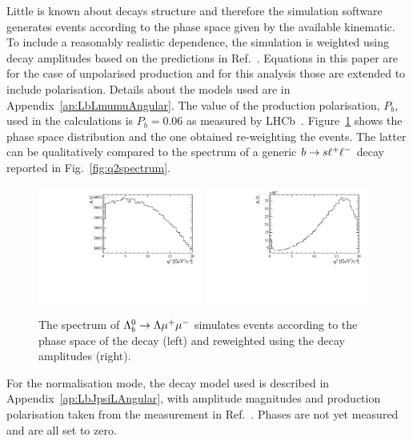 Little is known about \Lb decays structure and therefore the simulation software generates events
according to the phase space given by the available kinematic. To include a reasonably realistic \qsq dependence,
the simulation is weighted using decay amplitudes based on the predictions in Ref.~\cite{Gutsche:2013pp}.
Equations in this paper are for the case of unpolarised \Lb production and for this analysis those are extended to include polarisation.
Details about the models used are in Appendix~\ref{ap:LbLmumuAngular}. The value of the \Lb production polarisation, $P_b$, 
used in the calculations is $P_b = 0.06$ as measured by LHCb~\cite{Aaij:2013oxa}. 
Figure~\ref{fig:decaymodeleffonq2} shows the phase space \qsq distribution and the one obtained re-weighting the events.
The latter can be qualitatively compared to the \qsq spectrum of a generic ${b}\rightarrow{\ensuremath{s}}\ell^+ \ell^-$ decay
reported in Fig.~\ref{fig:q2spectrum}.
%
\begin{figure}
\centering
\includegraphics[width=0.48\textwidth]{Lmumu/figs/Q2_beforemodel.pdf}
\includegraphics[width=0.48\textwidth]{Lmumu/figs/Q2_aftermodel.pdf}
\caption{The \qsq spectrum of ${{\Lambda}^0_{b}}\rightarrow{\ensuremath{\Lambda}}{\ensuremath{\mu^+\mu^-}}$ simulates events according to the
phase space of the decay (left) and reweighted using the decay amplitudes (right).}
\label{fig:decaymodeleffonq2}
\end{figure}
%
For the normalisation mode, the decay model used is described in Appendix~\ref{ap:LbJpsiLAngular},
with amplitude magnitudes and production polarisation taken from the measurement in
Ref.~\cite{Aaij:2013oxa}. Phases are not yet measured and are all set to zero.

